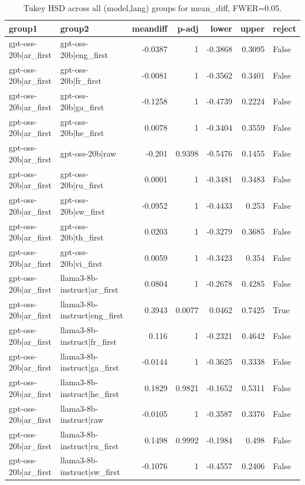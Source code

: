 \begin{table}
\caption{Tukey HSD across all (model,lang) groups for mean_diff, FWER=0.05.}
\label{tab:tukey_all_models_all_langs_mean_diff}
\begin{tabular}{l l r r r r l}
\toprule
group1 & group2 & meandiff & p-adj & lower & upper & reject \\
\midrule
gpt-oss-20b|ar_first & gpt-oss-20b|eng_first & -0.0387 & 1 & -0.3868 & 0.3095 & False \\
gpt-oss-20b|ar_first & gpt-oss-20b|fr_first & -0.0081 & 1 & -0.3562 & 0.3401 & False \\
gpt-oss-20b|ar_first & gpt-oss-20b|ga_first & -0.1258 & 1 & -0.4739 & 0.2224 & False \\
gpt-oss-20b|ar_first & gpt-oss-20b|he_first & 0.0078 & 1 & -0.3404 & 0.3559 & False \\
gpt-oss-20b|ar_first & gpt-oss-20b|raw & -0.201 & 0.9398 & -0.5476 & 0.1455 & False \\
gpt-oss-20b|ar_first & gpt-oss-20b|ru_first & 0.0001 & 1 & -0.3481 & 0.3483 & False \\
gpt-oss-20b|ar_first & gpt-oss-20b|sw_first & -0.0952 & 1 & -0.4433 & 0.253 & False \\
gpt-oss-20b|ar_first & gpt-oss-20b|th_first & 0.0203 & 1 & -0.3279 & 0.3685 & False \\
gpt-oss-20b|ar_first & gpt-oss-20b|vi_first & 0.0059 & 1 & -0.3423 & 0.354 & False \\
gpt-oss-20b|ar_first & llama3-8b-instruct|ar_first & 0.0804 & 1 & -0.2678 & 0.4285 & False \\
gpt-oss-20b|ar_first & llama3-8b-instruct|eng_first & 0.3943 & 0.0077 & 0.0462 & 0.7425 & True \\
gpt-oss-20b|ar_first & llama3-8b-instruct|fr_first & 0.116 & 1 & -0.2321 & 0.4642 & False \\
gpt-oss-20b|ar_first & llama3-8b-instruct|ga_first & -0.0144 & 1 & -0.3625 & 0.3338 & False \\
gpt-oss-20b|ar_first & llama3-8b-instruct|he_first & 0.1829 & 0.9821 & -0.1652 & 0.5311 & False \\
gpt-oss-20b|ar_first & llama3-8b-instruct|raw & -0.0105 & 1 & -0.3587 & 0.3376 & False \\
gpt-oss-20b|ar_first & llama3-8b-instruct|ru_first & 0.1498 & 0.9992 & -0.1984 & 0.498 & False \\
gpt-oss-20b|ar_first & llama3-8b-instruct|sw_first & -0.1076 & 1 & -0.4557 & 0.2406 & False \\

\end{tabular}
\end{table}
